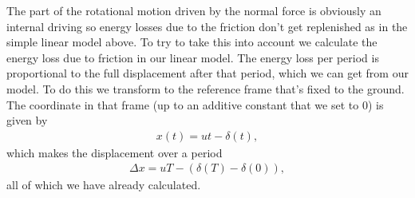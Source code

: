 \documentclass[10pt,a4paper,twocolumn]{article}
\begin{document}
The part of the rotational motion driven by the normal force is obviously an internal driving so energy losses due to the friction don't get replenished as in the simple linear model above. To try to take this into account we calculate the energy loss due to friction in our linear model. The energy loss per period is proportional to the full displacement after that period, which we can get from our model. To do this we transform to the reference frame that's fixed to the ground. The coordinate in that frame (up to an additive constant that we set to $0$) is given by
%
\begin{align}
    x(t) = u t - \delta(t),
\end{align} 
%
which makes the displacement over a period
%
\begin{align}
    \Delta x = u T - \left( \delta(T) - \delta(0) \right),
\end{align}
%
all of which we have already calculated.







\nocite{oregon}
\nocite{Prior1719}


\printbibliography
\end{document}
